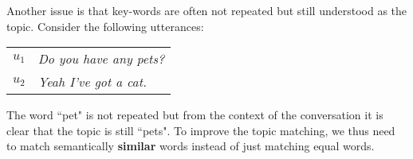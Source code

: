 Another issue is that key-words are often not repeated but still understood as the topic. Consider the following \glspl{utterance}:

\begin{table}[h]
    \begin{tabular}{l|l}
    $u_1$     & \textit{Do you have any pets?}                    \\
    $u_2$     & \textit{Yeah I've got a cat.}                        \\
    \end{tabular}
\end{table}

The word ``pet" is not repeated  but from the context of the conversation it is clear that the topic is still ``pets". To improve the topic matching, we thus need to match semantically \textbf{similar} words instead of just matching equal words.
